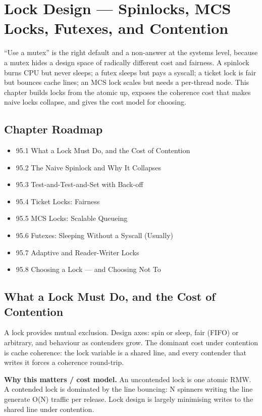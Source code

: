 \chapter{Lock Design --- Spinlocks, MCS Locks, Futexes, and Contention}

``Use a mutex'' is the right default and a non-answer at the systems level, because a mutex hides a design space of radically different cost and fairness. A spinlock burns CPU but never sleeps; a futex sleeps but pays a syscall; a ticket lock is fair but bounces cache lines; an MCS lock scales but needs a per-thread node. This chapter builds locks from the atomic up, exposes the coherence cost that makes naive locks collapse, and gives the cost model for choosing.

\section*{Chapter Roadmap}
\begin{itemize}
\item 95.1 What a Lock Must Do, and the Cost of Contention
\item 95.2 The Naive Spinlock and Why It Collapses
\item 95.3 Test-and-Test-and-Set with Back-off
\item 95.4 Ticket Locks: Fairness
\item 95.5 MCS Locks: Scalable Queueing
\item 95.6 Futexes: Sleeping Without a Syscall (Usually)
\item 95.7 Adaptive and Reader-Writer Locks
\item 95.8 Choosing a Lock --- and Choosing Not To
\end{itemize}

\section{What a Lock Must Do, and the Cost of Contention}
A lock provides mutual exclusion. Design axes: spin or sleep, fair (FIFO) or arbitrary, and behaviour as contenders grow. The dominant cost under contention is cache coherence: the lock variable is a shared line, and every contender that writes it forces a coherence round-trip.

\textbf{Why this matters / cost model.} An uncontended lock is one atomic RMW. A contended lock is dominated by the line bouncing: N spinners writing the line generate O(N) traffic per release. Lock design is largely minimising writes to the shared line under contention.

